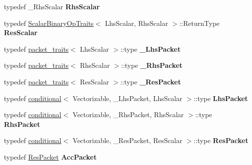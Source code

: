 \begin{DoxyCompactItemize}
typedef \+\_\+\+Rhs\+Scalar {\bfseries Rhs\+Scalar}
\item 
\mbox{\label{class_eigen_1_1internal_1_1gebp__traits_ac3d728a0433e7ef90f927de45957add7}} 
typedef \mbox{\hyperlink{struct_eigen_1_1_scalar_binary_op_traits}{Scalar\+Binary\+Op\+Traits}}$<$ Lhs\+Scalar, Rhs\+Scalar $>$\+::Return\+Type {\bfseries Res\+Scalar}
\item 
\mbox{\label{class_eigen_1_1internal_1_1gebp__traits_af99d6dfef8f5b992560601e7fed9b530}} 
typedef \mbox{\hyperlink{struct_eigen_1_1internal_1_1packet__traits}{packet\+\_\+traits}}$<$ Lhs\+Scalar $>$\+::type {\bfseries \+\_\+\+Lhs\+Packet}
\item 
\mbox{\label{class_eigen_1_1internal_1_1gebp__traits_a40b491d09a1def7c3257d0cd8b036226}} 
typedef \mbox{\hyperlink{struct_eigen_1_1internal_1_1packet__traits}{packet\+\_\+traits}}$<$ Rhs\+Scalar $>$\+::type {\bfseries \+\_\+\+Rhs\+Packet}
\item 
\mbox{\label{class_eigen_1_1internal_1_1gebp__traits_a702b198d941cbde47773b3ae27f75d3e}} 
typedef \mbox{\hyperlink{struct_eigen_1_1internal_1_1packet__traits}{packet\+\_\+traits}}$<$ Res\+Scalar $>$\+::type {\bfseries \+\_\+\+Res\+Packet}
\item 
\mbox{\label{class_eigen_1_1internal_1_1gebp__traits_a1a6611c59fbecd0ad3feae882714521e}} 
typedef \mbox{\hyperlink{struct_eigen_1_1internal_1_1conditional}{conditional}}$<$ Vectorizable, \+\_\+\+Lhs\+Packet, Lhs\+Scalar $>$\+::type {\bfseries Lhs\+Packet}
\item 
\mbox{\label{class_eigen_1_1internal_1_1gebp__traits_add54f631fcf0e21420054b51d0f2c888}} 
typedef \mbox{\hyperlink{struct_eigen_1_1internal_1_1conditional}{conditional}}$<$ Vectorizable, \+\_\+\+Rhs\+Packet, Rhs\+Scalar $>$\+::type {\bfseries Rhs\+Packet}
\item 
\mbox{\label{class_eigen_1_1internal_1_1gebp__traits_a104675cab0d5615df1fd429b077a98e7}} 
typedef \mbox{\hyperlink{struct_eigen_1_1internal_1_1conditional}{conditional}}$<$ Vectorizable, \+\_\+\+Res\+Packet, Res\+Scalar $>$\+::type {\bfseries Res\+Packet}
\item 
\mbox{\label{class_eigen_1_1internal_1_1gebp__traits_ad1a9a705dd13f8f610e958c4e2ca0f2a}} 
typedef \mbox{\hyperlink{struct_eigen_1_1internal_1_1true__type}{Res\+Packet}} {\bfseries Acc\+Packet}
\end{DoxyCompactItemize}
